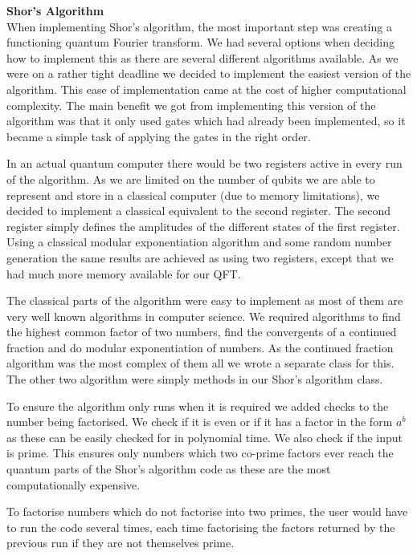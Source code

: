 \documentclass[bibliography=totocnumbered, 10pt]{article}
\newenvironment{myenumerate}{%
  \edef\backupindent{\the\parindent}%
  \enumerate%
  \setlength{\parindent}{\backupindent}%
}{\endenumerate}
\theoremstyle{NoticeStyle}
\begin{document}
\begin{myenumerate}
\begin{myenumerate}
		
		\item \textbf{Shor's Algorithm}\\
		When implementing Shor's algorithm, the most important step was creating a functioning quantum Fourier transform. We had several options when deciding how to implement this as there are several different algorithms available. As we were on a rather tight deadline we decided to implement the easiest version of the algorithm. This ease of implementation came at the cost of higher computational complexity. The main benefit we got from implementing this version of the algorithm was that it only used gates which had already been implemented, so it became a simple task of applying the gates in the right order. 
		
In an actual quantum computer there would be two registers active in every run of the algorithm. As we are limited on the number of qubits we are able to represent and store in a classical computer (due to memory limitations), we decided to implement a classical equivalent to the second register. The second register simply defines the amplitudes of the different states of the first register. Using a classical modular exponentiation  algorithm and some random number generation the same results are achieved as using two registers, except that we had much more memory available for our QFT.

The classical parts of the algorithm were easy to implement as most of them are very well known algorithms in computer science.  We required algorithms to find the highest common factor of two numbers, find the convergents of a continued fraction and do modular exponentiation of numbers. As the continued fraction algorithm was the most complex of them all we wrote a separate class for this. The other two algorithm were simply methods in our Shor's algorithm class.

To ensure the algorithm only runs when it is required we added checks to the number being factorised. We check if it is even or if it has a factor in the form $a^b$ as these can be easily checked for in polynomial time. We also check if the input is prime. This ensures only numbers which two co-prime factors ever reach the quantum parts of the Shor's algorithm code as these are the most computationally expensive. 

To factorise numbers which do not factorise into two primes, the user would have to run the code several times, each time factorising the factors returned by the previous run if they are not themselves prime.

	\end{myenumerate}
	
\end{myenumerate}
\end{document}
